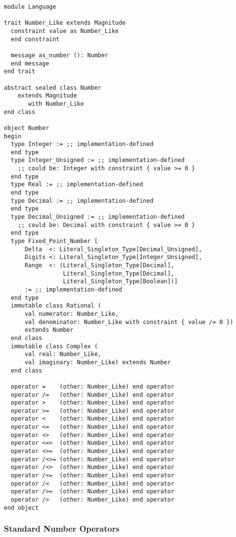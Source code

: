 \begin{lstlisting}
module Language

trait Number_Like extends Magnitude
  constraint value as Number_Like 
  end constraint
  
  message as_number (): Number 
  end message
end trait

abstract sealed class Number 
    extends Magnitude
       with Number_Like
end class

object Number
begin
  type Integer := ;; implementation-defined
  end type
  type Integer_Unsigned := ;; implementation-defined
    ;; could be: Integer with constraint { value >= 0 }
  end type
  type Real := ;; implementation-defined
  end type
  type Decimal := ;; implementation-defined
  end type
  type Decimal_Unsigned := ;; implementation-defined
    ;; could be: Decimal with constraint { value >= 0 }
  end type
  type Fixed_Point_Number [
      Delta  <: Literal_Singleton_Type[Decimal_Unsigned],
      Digits <: Literal_Singleton_Type[Integer_Unsigned],
      Range  <: (Literal_Singleton_Type[Decimal],
                 Literal_Singleton_Type[Decimal], 
                 Literal_Singleton_Type[Boolean])]
      := ;; implementation-defined
  end type
  immutable class Rational (
      val numerator: Number_Like, 
      val denominator: Number_Like with constraint { value /= 0 }) 
      extends Number
  end class
  immutable class Complex (
      val real: Number_Like,
      val imaginary: Number_Like) extends Number
  end class
  
  operator =    (other: Number_Like) end operator
  operator /=   (other: Number_Like) end operator
  operator >    (other: Number_Like) end operator
  operator >=   (other: Number_Like) end operator
  operator <    (other: Number_Like) end operator
  operator <=   (other: Number_Like) end operator
  operator <>   (other: Number_Like) end operator
  operator <=>  (other: Number_Like) end operator
  operator <>=  (other: Number_Like) end operator
  operator /<>= (other: Number_Like) end operator
  operator /<>  (other: Number_Like) end operator
  operator /<=  (other: Number_Like) end operator
  operator /<   (other: Number_Like) end operator
  operator />=  (other: Number_Like) end operator
  operator />   (other: Number_Like) end operator
end object
\end{lstlisting}

\subsubsection{Standard Number Operators}

